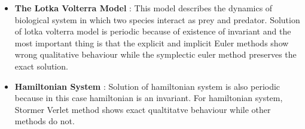 \documentclass[PhD]{iitmdiss} %
\begin{document}
{\begin{itemize}
    \item {\textbf{The Lotka Volterra Model} : This model describes the dynamics of biological system in which two species interact as prey and predator. Solution of lotka volterra model is periodic because of existence of invariant and the most important thing is that the explicit and implicit Euler methods show wrong qualitative behaviour while the symplectic euler method preserves the exact solution.}\\
    \item{\textbf{Hamiltonian System} : Solution of hamiltonian system is also periodic because in this case hamiltonian is an invariant. For hamiltonian system, Stormer Verlet method shows exact qualtitatve behaviour while other methods do not.}\\
    
\end{itemize}
}
\end{document}
